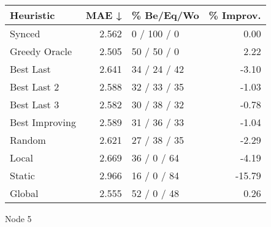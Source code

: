 \begin{tabular}{lrlr}
\toprule
\textbf{Heuristic} & \textbf{MAE ↓} & \textbf{\% Be/Eq/Wo} & \textbf{\% Improv.} \\
\midrule
            Synced &          2.562 &          0 / 100 / 0 &                0.00 \\
     Greedy Oracle &          2.505 &          50 / 50 / 0 &                2.22 \\
         Best Last &          2.641 &         34 / 24 / 42 &               -3.10 \\
       Best Last 2 &          2.588 &         32 / 33 / 35 &               -1.03 \\
       Best Last 3 &          2.582 &         30 / 38 / 32 &               -0.78 \\
    Best Improving &          2.589 &         31 / 36 / 33 &               -1.04 \\
            Random &          2.621 &         27 / 38 / 35 &               -2.29 \\
             Local &          2.669 &          36 / 0 / 64 &               -4.19 \\
            Static &          2.966 &          16 / 0 / 84 &              -15.79 \\
            Global &          2.555 &          52 / 0 / 48 &                0.26 \\
\bottomrule
\end{tabular}
\caption{Node 5}
\label{tab:hr_iid_lr05_le2_bs4_5}
